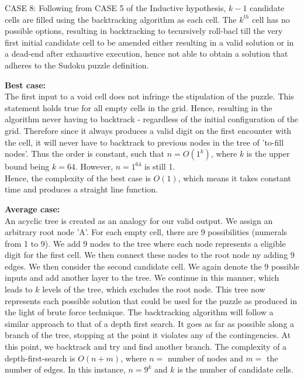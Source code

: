 \documentclass[12pt]{article}
\begin{document}
\begin{flushleft}
CASE 8: Following from CASE 5 of the Inductive hypothesis, $k-1$ candidate cells are filled using the backtracking algorithm as each cell. The $k^{th}$ cell has no possible options, resulting in backtracking to tecursively roll-bacl till the very first initial candidate cell to be amended either resulting in a valid solution or in a dead-end after exhaustive execution, hence not able to obtain a solution that adheres to the Sudoku puzzle definition. 
\end{flushleft}
\begin{flushleft}
\textbf{Best case:}\\
The first input to a void cell does not infringe the stipulation of the puzzle. This statement holds true for all empty cells in the grid. Hence, resulting in the algorithm never having to backtrack - regardless of the initial configuration of the grid. Therefore since it always produces a valid digit on the first encounter with the cell, it will never have to backtrack to previous nodes in the tree of 'to-fill nodes'. Thus the order is constant, such that $n = O(1^k) $, where $k$ is the upper bound being $k = 64$. However, $n = 1^{64}$ is still 1. \\
Hence, the complexity of the best case is  $O(1)$, which means it takes constant time and produces a straight line function.
\end{flushleft}
\begin{flushleft}
\textbf{Average case:}\\
An acyclic tree is created as an analogy for our valid output. We assign an arbitrary root node 'A'. For each empty cell, there are 9 possibilities (numerals from 1 to 9). We add 9 nodes to the tree where each node represents a eligible digit for the first cell. We then connect these nodes to the root node ny adding 9 edges. We then consider the second candidate cell. We again denote the 9 possible inputs and add another layer to the tree. We continue in this manner, which leads to $k$ levels of the tree, which excludes the root node. This tree now represents each possible solution that could be used for the puzzle as produced in the light of brute force technique. The backtracking algorithm will follow a  similar approach to that of a depth first search. It goes as far as possible along a branch of the tree, stopping at the point it violates any of the contingencies. At this point, we backtrack and try and find another branch. The complexity of a depth-first-search is $O(n+m)$, where $n = $ number of nodes and $m = $ the number of edges. In this instance, $n = 9^k$ and $k$ is the number of candidate cells.   
\end{flushleft}
\end{document}
